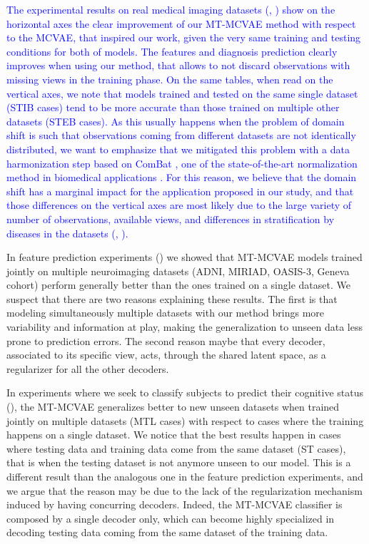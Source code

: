 \textcolor{blue}{
	The experimental results on real medical imaging datasets (, ) show on the horizontal axes the clear improvement of our MT-MCVAE method with respect to the MCVAE, that inspired our work,
	given the very same training and testing conditions for both of models.
	The features and diagnosis prediction clearly improves when using our method, that allows to not discard observations with missing views in the training phase.
	On the same tables, when read on the vertical axes, we note that models trained and tested on the same single dataset (STIB cases) tend to be more accurate than those trained on multiple other datasets (STEB cases).
	As this usually happens when the problem of domain shift is such that observations coming from different datasets are not identically distributed,
	we want to emphasize that we mitigated this problem with a data harmonization step based on ComBat \citep{combat},
	one of the state-of-the-art normalization method in biomedical applications \citep{Fortin2017, Fortin2018, Orlhac2020}.
	For this reason, we believe that the domain shift has a marginal impact for the application proposed in our study,
	and that those differences on the vertical axes are most likely due to the large variety of number of observations, available views, and differences in stratification by diseases in the datasets (\cf {}, ).
}

In feature prediction experiments () we showed that MT-MCVAE models trained jointly on multiple neuroimaging datasets (ADNI, MIRIAD, OASIS-3, Geneva cohort)
perform generally better than the ones trained on a single dataset.
We suspect that there are two reasons explaining these results.
The first is that modeling simultaneously multiple datasets with our method brings more variability and information at play, making the generalization to unseen data less prone to prediction errors.
The second reason maybe that every decoder, associated to its specific view, acts, through the shared latent space, as a regularizer for all the other decoders.

In experiments where we seek to classify subjects to predict their cognitive status (),
the MT-MCVAE generalizes better to new unseen datasets when trained jointly on multiple datasets (MTL cases) with respect to cases where the training happens on a single dataset.
We notice that the best results happen in cases where testing data and training data come from the same dataset (ST cases), that is when the testing dataset is not anymore unseen to our model.
This is a different result than the analogous one in the feature prediction experiments, and we argue that the reason may be due to the lack of the regularization mechanism induced by having concurring decoders.
Indeed, the MT-MCVAE classifier is composed by a single decoder only, which can become highly specialized in decoding testing data coming from the same dataset of the training data.


